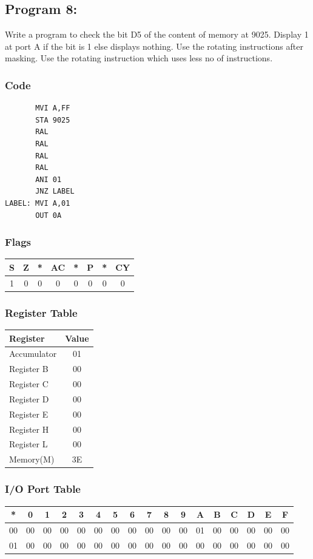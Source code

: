 \documentclass[]{report}
\begin{document}
\vspace{10mm}
\subsection*{Program 8: }
Write a program to check the bit D5 of the content of memory at 9025. Display 1 at port A if the bit is 1 else displays nothing. Use the rotating instructions after masking. Use the rotating instruction which uses less no of instructions.

\subsubsection{Code}
\begin{verbatim}
	   MVI A,FF
	   STA 9025
	   RAL
	   RAL
	   RAL
	   RAL
	   ANI 01
	   JNZ LABEL
LABEL: MVI A,01
	   OUT 0A
\end{verbatim}
\subsubsection{Flags}
\begin{tabular}{cccccccc}
\hline
    S & Z & *  & AC & *  & P & *  & CY  \\
    \hline
    1&0&0&0&0&0&0&0 \\
    \hline
\end{tabular}
\subsubsection {Register Table}
\begin{tabular}{lc}
    \hline
    Register & Value\\
    \hline
    Accumulator     & 01        \\
    Register B      &  00        \\
    Register C      &  00        \\
    Register D      &   00       \\
    Register E      &   00       \\
    Register H      &  00        \\
    Register L      &  00         \\
    Memory(M)       &      3E         \\
    \hline

\end{tabular}
\subsubsection {I/O Port Table}
\begin{tabular}{ccccccccccccccccc}
    \hline
    * & 0 & 1 & 2 & 3 & 4 & 5 & 6 & 7 & 8 & 9 & A & B & C & D & E & F  \\
        \hline

    00 & 00 & 00 & 00 & 00 & 00 & 00 & 00 & 00 & 00 & 00 & 01 & 00 & 00 & 00 & 00 & 00 \\
    01 & 00 & 00 & 00 & 00 & 00 & 00 & 00 & 00 & 00 & 00 & 00 & 00 & 00 & 00 & 00 & 00 \\

    \hline
\end{tabular}
\end{document}
